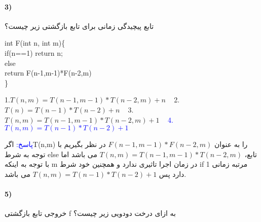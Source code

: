\documentclass[10pt,a4paper]{article}
\begin{document}
	\paragraph{3)}تابع پیچیدگی زمانی برای تابع بازگشتی زیر چیست؟

	\begin{flushleft}
		\begin{latin}
			int F(int n, int m)\{\\
			\hspace{1cm}if(n==1) return n;\\
			\hspace{1cm}else\\
			\hspace{2cm}return F(n-1,m-1)*F(n-2,m)\\
			\}
		\end{latin}
	\end{flushleft}
	\begin{flushright} 
		1.$T(n,m)=T(n-1,m-1)*T(n-2,m)+n$\,\,\,\,\, 2.$T(n)=T(n-1)*T(n-2)+n$\,\,\,\,\, 3.$T(n,m)=T(n-1,m-1)*T(n-2,m)+1$\,\,\,\,\, \textcolor{blue}{4.$T(n,m)=T(n-1)*T(n-2)+1$}
	\end{flushright}
	\begin{flushright} 
		\textcolor{blue}{پاسخ:}
		اگرT(n,m) را به عنوان $F(n-1,m-1)*F(n-2,m)$ در نظر بگیریم با توجه به شرط else تابع، $T(n,m) =T(n-1,m-1)*T(n-2,m) $ می باشد اما با توجه به اینکه m در زمان اجرا تاثیری ندارد و همچنین خود شرط if مرتبه زمانی 1 دارد پس $T(n,m)=T(n-1)*T(n-2)+1$ می باشد.
	\end{flushright}

	\paragraph{5)} خروجی تابع بازگشتی f به ازای درخت دودویی زیر چیست؟
\end{document}
